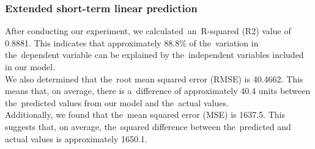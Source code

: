     \subsubsection{Extended short-term linear prediction}\label{subsec:res_estlp}
    After conducting our experiment, we calculated~an~R-squared (R2) value of 0.8881.
    This indicates that approximately 88.8\% of the~variation in the~dependent
    variable can be explained by the~independent variables included in our model.\\ 
    We also determined that the~root mean squared error (RMSE) is 40.4662.
    This means that, on average, there is a~difference of approximately 40.4
    units between the~predicted values from our model and the~actual values.\\
    Additionally, we found that the~mean squared error (MSE) is 1637.5.
    This suggests that, on average, the~squared difference between the~predicted
    and actual values is approximately 1650.1.
